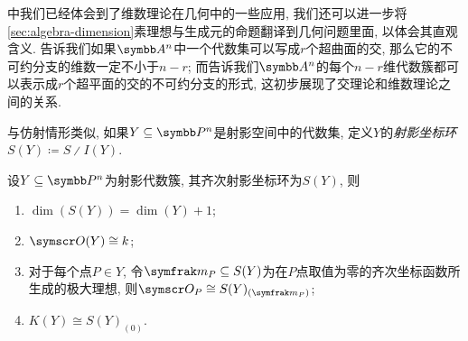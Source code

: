 中我们已经体会到了维数理论在几何中的一些应用, 我们还可以进一步将\ref{sec:algebra-dimension}素理想与生成元的命题翻译到几何问题里面, 以体会其直观含义. 告诉我们如果$\AF^n$中一个代数集可以写成$r$个超曲面的交, 那么它的不可约分支的维数一定不小于$n-r$; 而告诉我们$\AF^n$的每个$n-r$维代数簇都可以表示成$r$个超平面的交的不可约分支的形式, 这初步展现了交理论和维数理论之间的关系.

\bigskip

与仿射情形类似, 如果$Y\subseteq \PP^n$是射影空间中的代数集, 定义$Y$的\emph{射影坐标环}$S(Y)\coloneq S{\divslash}I(Y)$.

\begin{theorem}\label{thm:projectiverings}
  设$Y\subseteq\PP^n$为射影代数簇, 其齐次射影坐标环为$S(Y)$, 则
  \begin{enumerate}
    \item\label{enum:thm-projective-rings-1} $\dim (S(Y))=\dim (Y)+1$;
    \item\label{enum:thm-projective-rings-2} $\OO (Y)\cong\kk$;
    \item\label{enum:thm-projective-rings-3} 对于每个点$P\in Y$, 令$\ideal{m}_P\subseteq S(Y)$为在$P$点取值为零的齐次坐标函数所生成的极大理想, 则$\OO_P\cong S(Y)_{(\ideal{m}_P)}$;
    \item\label{enum:thm-projective-rings-4} $K(Y)\cong S(Y)_{(0)}$.
  \end{enumerate}
\end{theorem}


